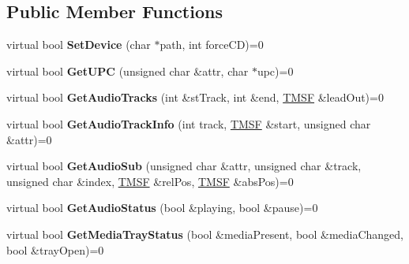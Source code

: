 \subsection*{Public Member Functions}
\begin{DoxyCompactItemize}
\item 
\hypertarget{classCDROM__Interface_a60081f8d721b4456172f0a0b0d3b3b5a}{virtual bool {\bfseries Set\-Device} (char $\ast$path, int force\-C\-D)=0}\label{classCDROM__Interface_a60081f8d721b4456172f0a0b0d3b3b5a}

\item 
\hypertarget{classCDROM__Interface_a7f2eaeb90673c95fd018ce1ff4f1fdaa}{virtual bool {\bfseries Get\-U\-P\-C} (unsigned char \&attr, char $\ast$upc)=0}\label{classCDROM__Interface_a7f2eaeb90673c95fd018ce1ff4f1fdaa}

\item 
\hypertarget{classCDROM__Interface_a3d9e5cf2a5812edc31badb6e4a79d51c}{virtual bool {\bfseries Get\-Audio\-Tracks} (int \&st\-Track, int \&end, \hyperlink{structSMSF}{T\-M\-S\-F} \&lead\-Out)=0}\label{classCDROM__Interface_a3d9e5cf2a5812edc31badb6e4a79d51c}

\item 
\hypertarget{classCDROM__Interface_adda0f3d505f7cd4bdf762508fc1962fb}{virtual bool {\bfseries Get\-Audio\-Track\-Info} (int track, \hyperlink{structSMSF}{T\-M\-S\-F} \&start, unsigned char \&attr)=0}\label{classCDROM__Interface_adda0f3d505f7cd4bdf762508fc1962fb}

\item 
\hypertarget{classCDROM__Interface_a2028b67399e88e5ce1ea1d18a1db75fb}{virtual bool {\bfseries Get\-Audio\-Sub} (unsigned char \&attr, unsigned char \&track, unsigned char \&index, \hyperlink{structSMSF}{T\-M\-S\-F} \&rel\-Pos, \hyperlink{structSMSF}{T\-M\-S\-F} \&abs\-Pos)=0}\label{classCDROM__Interface_a2028b67399e88e5ce1ea1d18a1db75fb}

\item 
\hypertarget{classCDROM__Interface_a5f5e3fd21c495a0a4f55e79b18b69729}{virtual bool {\bfseries Get\-Audio\-Status} (bool \&playing, bool \&pause)=0}\label{classCDROM__Interface_a5f5e3fd21c495a0a4f55e79b18b69729}

\item 
\hypertarget{classCDROM__Interface_a3891396e99454752aafc695813e495e8}{virtual bool {\bfseries Get\-Media\-Tray\-Status} (bool \&media\-Present, bool \&media\-Changed, bool \&tray\-Open)=0}\label{classCDROM__Interface_a3891396e99454752aafc695813e495e8}


\end{DoxyCompactItemize}
